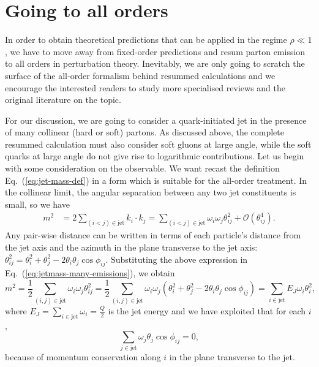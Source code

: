 \section{Going to all orders}\label{sec:jet-mass-res}
In order to obtain theoretical predictions that can be applied in the regime $\rho \ll1$, we have to move away from fixed-order predictions and resum parton emission to all orders in perturbation theory. 
%
%
Inevitably, we are only going to scratch the surface of the all-order formalism behind resummed calculations and we encourage the interested readers to study more specialised reviews and the original literature on the topic.

For our discussion, we are going to consider a quark-initiated jet in the presence of many collinear (hard or soft) partons. As discussed above, the complete resummed calculation must also consider soft gluons at large angle, while the soft quarks at large angle do not give rise to logarithmic contributions.
%
Let us begin with some consideration on the observable. We want recast the definition Eq.~(\ref{eq:jet-mass-def}) in a form which is suitable for the all-order treatment. 
%
In the collinear limit, the angular separation between any two jet constituents is small, so we have
\begin{align} \label{eq:jetmass-many-emissions}
m^2&= 2\sum_{(i<j)\in \text{jet}} k_i \cdot k_j
=\sum_{(i<j)\in \text{jet}}  \omega_i \omega_j \theta_{ij}^2+ \mathcal{O}\left(\theta_{ij}^4\right).
\end{align}
Any pair-wise distance can be written in terms of each particle's
distance from the jet axis and the azimuth in the plane transverse to
the jet axis: $\theta_{ij}^2= \theta_i^2+\theta_j^2-2 \theta_i \theta_j \cos \phi_{ij}$.
Substituting the above expression in Eq.~(\ref{eq:jetmass-many-emissions}), we obtain
\begin{equation}\label{eq:jetmass-many-emissions-2}
m^2=
\frac{1}{2} \sum_{(i,j) \in \text{jet}} \omega_i \omega_j \theta_{ij}^2
 = \frac{1}{2}
 \sum_{(i,j) \in \text{jet}} \omega_i \omega_j \left(\theta_i^2+\theta_j^2-2 \theta_i \theta_j \cos \phi_{ij} \right) =  \sum_{i \in \text{jet}} E_J \omega_i \theta_i^2,
\end{equation}
%
where $E_J= \sum_{i \in \text{jet}} \omega_i=\tfrac{Q}{2}$ is the jet energy and we have exploited that for each $i$,
\begin{equation}
\sum_{j \in \text{jet}} \omega_j \theta_j \cos \phi_{ij}=0,
\end{equation}
because of momentum conservation along $i$ in the plane transverse to the jet.


